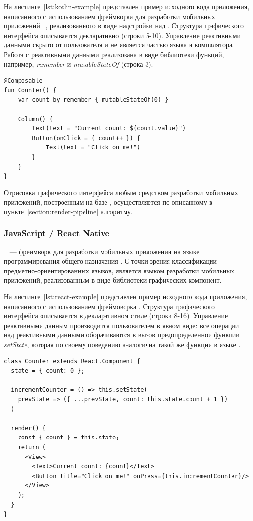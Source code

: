 На листинге~\ref{lst:kotlin-example} представлен пример исходного кода
приложения, написанного с использованием фреймворка для разработки мобильных
приложений ~\cite{jp-compose-homepage},
реализованного в виде надстройки над .
Структура графического интерфейса описывается декларативно (строки 5-10).
Управление реактивными данными скрыто от пользователя и не является частью
языка и компилятора. Работа с реактивными данными реализована в виде
библиотеки функций, например, \textit{remember} и \textit{mutableStateOf}
(строка 3).
\begin{lstlisting}[language=my_pseudo,caption=\name{Jetpack Compose}.
Счётчик нажатия кнопки,label={lst:kotlin-example}]
@Composable
fun Counter() {
    var count by remember { mutableStateOf(0) }
    
    Column() {
        Text(text = "Current count: ${count.value}")    
        Button(onClick = { count++ }) {
            Text(text = "Click on me!")
        }
    }
}
\end{lstlisting}

Отрисовка графического интерфейса любым средством разработки мобильных
приложений, построенным на базе , осуществляется по
описанному в пункте~\ref{section:render-pipeline} алгоритму.

\subsubsection*{JavaScript / React Native}
~\cite{reactnative-homepage} --- фреймворк для разработки
мобильных приложений на языке программирования общего назначения
. С точки зрения классификации предметно-ориентированных
языков,  является языком разработки мобильных приложений,
реализованным в виде библиотеки графических компонент.

На листинге~\ref{lst:react-example} представлен пример исходного кода
приложения, написанного с использованием фреймоворка .
Структура графического интерфейса описывается в декларативном стиле
(строки 8-16).
Управление реактивными данным производится пользователем в явном виде:
все операции над реактивными данными оборачиваются в вызов предопределённой
функции \textit{setState}, которая по своему поведению аналогична такой же
функции в языке .
\begin{lstlisting}[language=my_pseudo,caption=\name{React Native}.
Счётчик нажатия кнопки,label={lst:react-example}]
class Counter extends React.Component {
  state = { count: 0 };

  incrementCounter = () => this.setState(
    prevState => ({ ...prevState, count: this.state.count + 1 })
  )

  render() {
    const { count } = this.state;
    return (
      <View>
        <Text>Current count: {count}</Text>
        <Button title="Click on me!" onPress={this.incrementCounter}/>
      </View>
    );
  }
}
\end{lstlisting}

